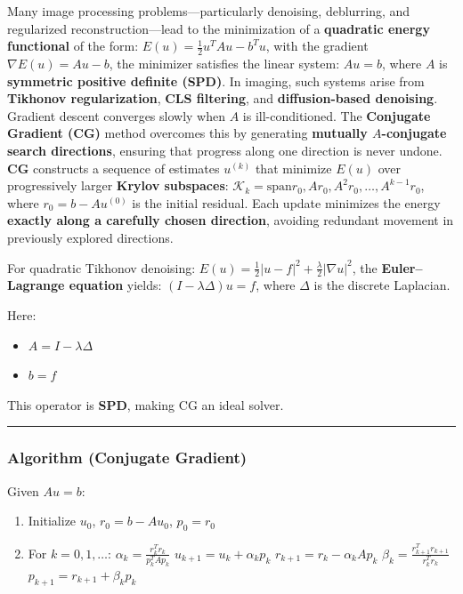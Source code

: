 \documentclass[11pt]{article}
\providecommand{\tightlist}{%
      \setlength{\itemsep}{0pt}\setlength{\parskip}{0pt}}
\begin{document}
Many image processing problems---particularly denoising, deblurring, and
regularized reconstruction---lead to the minimization of a
\textbf{quadratic energy functional} of the form:
\(E(u) = \frac{1}{2}u^T A u - b^T u\), with the gradient
\(\nabla E(u) = A u - b\), the minimizer satisfies the linear system:
\(A u = b\), where \(A\) is \textbf{symmetric positive definite (SPD)}.
In imaging, such systems arise from \textbf{Tikhonov regularization},
\textbf{CLS filtering}, and \textbf{diffusion-based denoising}. Gradient
descent converges slowly when \(A\) is ill-conditioned. The
\textbf{Conjugate Gradient (CG)} method overcomes this by generating
\textbf{mutually \(A\)-conjugate search directions}, ensuring that
progress along one direction is never undone. \textbf{CG} constructs a
sequence of estimates \(u^{(k)}\) that minimize \(E(u)\) over
progressively larger \textbf{Krylov subspaces}:
\(\mathcal{K}_k = \text{span}{r_0, A r_0, A^2 r_0, \ldots, A^{k-1} r_0}\),
where \(r_0 = b - A u^{(0)}\) is the initial residual. Each update
minimizes the energy \textbf{exactly along a carefully chosen
direction}, avoiding redundant movement in previously explored
directions.

For quadratic Tikhonov denoising:
\(E(u) = \frac{1}{2}|u - f|^2 + \frac{\lambda}{2}|\nabla u|^2\), the
\textbf{Euler--Lagrange equation} yields:
\((I - \lambda \Delta) u = f\), where \(\Delta\) is the discrete
Laplacian.

Here:

\begin{itemize}
\tightlist
\item
  \(A = I - \lambda \Delta\)
\item
  \(b = f\)
\end{itemize}

This operator is \textbf{SPD}, making CG an ideal solver.

\begin{center}\rule{0.5\linewidth}{0.5pt}\end{center}

\hypertarget{algorithm-conjugate-gradient}{%
\subsubsection{\texorpdfstring{\textbf{Algorithm (Conjugate
Gradient)}}{Algorithm (Conjugate Gradient)}}\label{algorithm-conjugate-gradient}}

Given \(A u = b\):

\begin{enumerate}
\def\labelenumi{\arabic{enumi}.}
\tightlist
\item
  Initialize \(u_0\), \(r_0 = b - A u_0\), \(p_0 = r_0\)
\item
  For \(k = 0,1,\dots\): \(\alpha_k = \frac{r_k^T r_k}{p_k^T A p_k}\)
  \(u_{k+1} = u_k + \alpha_k p_k\) \(r_{k+1} = r_k - \alpha_k A p_k\)
  \(\beta_k = \frac{r_{k+1}^T r_{k+1}}{r_k^T r_k}\)
  \(p_{k+1} = r_{k+1} + \beta_k p_k\)
\end{enumerate}
\end{document}
